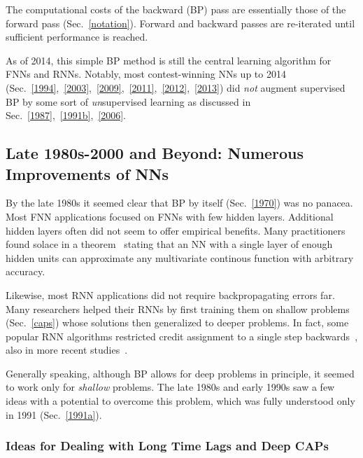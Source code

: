 \documentclass[letterpaper]{article}
\begin{document}
\begin{CJK*}{UTF8}{gbsn}
\begin{sloppypar}
The computational costs of the backward (BP) pass are essentially those of the forward pass
(Sec.~\ref{notation}).
Forward and backward passes are re-iterated until sufficient performance is reached.

As of 2014, this simple BP method is still the central learning algorithm for FNNs and RNNs.
Notably,
most contest-winning NNs up to 2014 (Sec.~\ref{1994},~\ref{2003},~\ref{2009},~\ref{2011},~\ref{2012},~\ref{2013})
did {\em not} augment supervised BP by 
some sort of {\em un}supervised learning as discussed in Sec.~\ref{1987},~\ref{1991b},~\ref{2006}.

\subsection{Late 1980s-2000 and Beyond: Numerous Improvements of NNs}
\label{1990}


By the late 1980s it seemed clear that BP by itself (Sec.~\ref{1970}) was no panacea.
Most FNN applications focused on FNNs with few hidden layers.
Additional hidden layers often did not seem to offer empirical benefits.
Many practitioners found solace in a theorem~\citep{Kolmogorov:57,hecht1989,hornik1989}
stating that an NN with a single layer of enough hidden units 
can approximate any multivariate continous function
with arbitrary accuracy.



Likewise, most RNN applications 
did not require backpropagating errors far. 
Many researchers helped their RNNs by first 
training them on shallow problems (Sec.~\ref{caps})
whose solutions then generalized to deeper problems.  
In fact, some popular RNN algorithms restricted credit 
assignment to a single step backwards~\citep{elman1990,Jordan:86,jordan1997},
also in more recent studies~\citep{Jaeger2001a,maass2002,Jaeger:04}. 

Generally speaking, although BP allows for deep problems in principle,
it seemed to work only for {\em shallow} problems.  
The late 1980s and early 1990s saw a few ideas 
with a potential to overcome this problem,
which was fully understood only in 1991 (Sec.~\ref{1991a}).




\subsubsection{Ideas for Dealing with Long Time Lags and Deep CAPs}
\label{timelags}


\end{sloppypar}
\end{CJK*}
\end{document}

